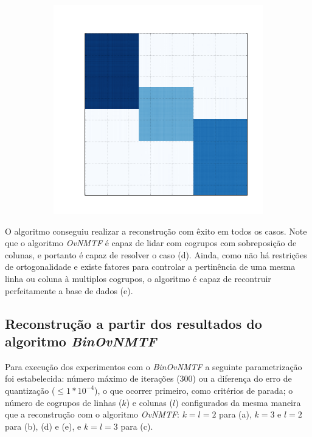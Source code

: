 \documentclass[
    12pt,                %
    oneside,            %
    a4paper,            %
    english,            %
    brazil                %
    ]{abntex2ppgsi}
\begin{document}
\begin{figure}[H]
\begin{subfigure}[b]{0.18\textwidth}
        \caption{}
    \end{subfigure}
    \begin{subfigure}[b]{0.18\textwidth}
        \includegraphics[width=\textwidth]{img/e-reconstruction-ovnmtf.png}
        \caption{}
    \end{subfigure}
    \label{fig:reconstruction:ovnmtf}
\end{figure}

O algoritmo conseguiu realizar a reconstrução com êxito em todos os casos.
Note que o algoritmo \textit{OvNMTF} é capaz de lidar com cogrupos com sobreposição de colunas, e portanto é capaz de resolver o caso (d).
Ainda, como não há restrições de ortogonalidade e existe fatores para controlar a pertinência de uma mesma linha ou coluna à multiplos cogrupos, o algoritmo é capaz de recontruir perfeitamente a base de dados (e).

\subsection{Reconstrução a partir dos resultados do algoritmo \textit{Bin\-OvNMTF}}
\label{subsec:results-reconstruction-binovnmtf}

Para execução dos experimentos com o \textit{BinOvNMTF} a seguinte parametrização foi estabelecida: número máximo de iterações ($300$) ou a diferença do erro de quantização ($\leq 1 * 10^{-4}$), o que ocorrer primeiro, como critérios de parada; o número de cogrupos de linhas ($k$) e colunas ($l$) configurados da mesma maneira que a reconstrução com o algoritmo \textit{OvNMTF}: $k = l = 2$ para (a), $k = 3$ e $l = 2$ para (b), (d) e (e), e $k = l = 3$ para (c).
\end{document}
